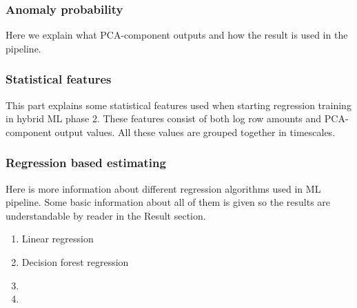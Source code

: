 
\subsubsection*{Anomaly probability}
\begin{itcomment}
    Here we explain what PCA-component outputs and how the result is used in the pipeline.
\end{itcomment}

\subsubsection*{Statistical features}
\begin{itcomment}
    This part explains some statistical features used when starting regression training
    in hybrid ML phase 2.
    These features consist of both log row amounts
    and PCA-component output values.
    All these values are grouped together in timescales.
\end{itcomment}


\subsubsection*{Regression based estimating}
\begin{itcomment}
    Here is more information about different regression algorithms
    used in ML pipeline.
    Some basic information about all of them is given so the results are understandable
    by reader in the Result section.
\end{itcomment}

\begin{enumerate}
    \item Linear regression
    \item Decision forest regression
    \item \etc
    \item \etc
\end{enumerate}


\clearpage